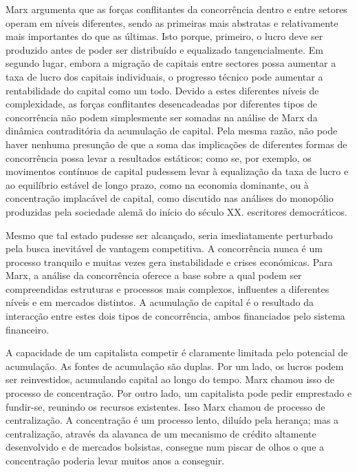  \par 
Marx argumenta que as forças conflitantes da concorrência dentro e entre setores operam em níveis diferentes, sendo as primeiras mais abstratas e relativamente mais importantes do que as últimas. Isto porque, primeiro, o lucro deve ser produzido antes de poder ser distribuído e equalizado tangencialmente. Em segundo lugar, embora a migração de capitais entre sectores possa aumentar a taxa de lucro dos capitais individuais, o progresso técnico pode aumentar a rentabilidade do capital como um todo. Devido a estes diferentes níveis de complexidade, as forças conflitantes desencadeadas por diferentes tipos de concorrência não podem simplesmente ser somadas na análise de Marx da dinâmica contraditória da acumulação de capital. Pela mesma razão, não pode haver nenhuma presunção de que a soma das implicações de diferentes formas de concorrência possa levar a resultados estáticos; como se, por exemplo, os movimentos contínuos de capital pudessem levar à equalização da taxa de lucro e ao equilíbrio estável de longo prazo, como na economia dominante, ou à concentração implacável de capital, como discutido nas análises do monopólio produzidas pela sociedade alemã do início do século XX. escritores democráticos.
 \par 
Mesmo que tal estado pudesse ser alcançado, seria imediatamente perturbado pela busca inevitável de vantagem competitiva. A concorrência nunca é um processo tranquilo e muitas vezes gera instabilidade e crises económicas. Para Marx, a análise da concorrência oferece a base sobre a qual podem ser compreendidas estruturas e processos mais complexos, influentes a diferentes níveis e em mercados distintos. A acumulação de capital é o resultado da interacção entre estes dois tipos de concorrência, ambos financiados pelo sistema financeiro.
 \par 
A capacidade de um capitalista competir é claramente limitada pelo potencial de acumulação. As fontes de acumulação são duplas. Por um lado, os lucros podem ser reinvestidos, acumulando capital ao longo do tempo. Marx chamou isso de processo de concentração. Por outro lado, um capitalista pode pedir emprestado e fundir-se, reunindo os recursos existentes. Isso Marx chamou de processo de centralização. A concentração é um processo lento, diluído pela herança; mas a centralização, através da alavanca de um mecanismo de crédito altamente desenvolvido e de mercados bolsistas, consegue num piscar de olhos o que a concentração poderia levar muitos anos a conseguir.
 \par 
